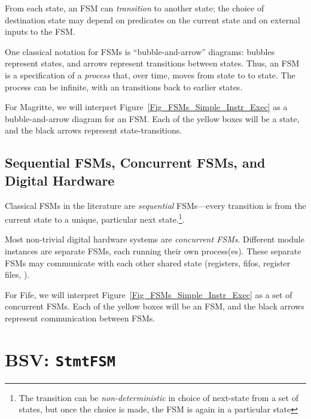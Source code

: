 From each state, an FSM can \emph{transition} to another state; the
choice of destination state may depend on predicates on the current
state and on external inputs to the FSM.

One classical notation for FSMs is ``bubble-and-arrow'' diagrams:
bubbles represent states, and arrows represent transitions between
states.  Thus, an FSM is a specification of a \emph{process} that,
over time, moves from state to to state.  The process can be infinite,
with an transitions back to earlier states.


For Magritte, we will interpret
Figure~\ref{Fig_FSMs_Simple_Instr_Exec} as a bubble-and-arrow diagram
for an FSM.  Each of the yellow boxes will be a state, and the black
arrows represent state-transitions.


\subsection{Sequential FSMs, Concurrent FSMs, and Digital Hardware}


Classical FSMs in the literature are \emph{sequential} FSMs---every
transition is from the current state to a unique, particular next
state.\footnote{The transition can be \emph{non-deterministic} in
choice of next-state from a set of states, but once the choice is
made, the FSM is again in a particular state}.

Most non-trivial digital hardware systems are \emph{concurrent FSMs}.
Different module instances are separate FSMs, each running their own
process(es).  These separate FSMs may communicate with each other
{\via} shared state (registers, fifos, register files, {\etc}).


For Fife, we will interpret Figure~\ref{Fig_FSMs_Simple_Instr_Exec} as
a set of concurrent FSMs.  Each of the yellow boxes will be an FSM,
and the black arrows represent communication between FSMs.


\section{BSV: {\tt StmtFSM}}

